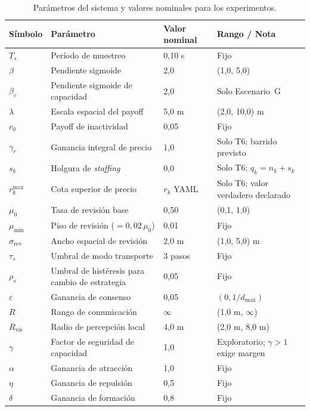 \begin{table}[htbp]
\centering
\scriptsize
\renewcommand{\arraystretch}{1.08}
\caption[Parámetros del sistema]{Parámetros del sistema y valores nominales para los experimentos.}
\label{tab:params}
\begin{tabularx}{\textwidth}{>{\ttfamily}p{}p{}p{}Y}
\toprule
\normalfont Símbolo & Parámetro & Valor nominal & Rango / Nota \\
\midrule
$T_s$ & Período de muestreo & 0{,}10 s & Fijo \\
$\beta$ & Pendiente sigmoide & 2{,}0 & (1{,}0, 5{,}0) \\
$\beta_c$ & Pendiente sigmoide de capacidad & 2{,}0 & Solo Escenario~G \\
$\lambda$ & Escala espacial del payoff & 5{,}0 m & (2{,}0, 10{,}0) m \\
$r_0$ & Payoff de inactividad & 0{,}05 & Fijo \\
$\gamma_r$ & Ganancia integral de precio & 1{,}0 & Solo T6; barrido previsto \\
$s_k$ & Holgura de \emph{staffing} & 0{,}0 & Solo T6; $q_k=n_k+s_k$ \\
$r_k^{\max}$ & Cota superior de precio & $r_k$ YAML & Solo T6; valor verdadero declarado \\
$\mu_0$ & Tasa de revisión base & 0{,}50 & (0{,}1, 1{,}0) \\
$\mu_{\min}$ & Piso de revisión ($= 0{,}02\,\mu_0$) & 0{,}01 & Fijo \\
$\sigma_{\text{rev}}$ & Ancho espacial de revisión & 2{,}0 m & (1{,}0, 5{,}0) m \\
$\tau_s$ & Umbral de modo transporte & 3 pasos & Fijo \\
$\rho_s$ & Umbral de histéresis para cambio de estrategia & 0{,}05 & Fijo \\
$\varepsilon$ & Ganancia de consenso & 0{,}05 & $(0, 1/d_{\max})$ \\
$R$ & Rango de comunicación & $\infty$ & (1{,}0 m, $\infty$) \\
$R_{\mathrm{vis}}$ & Radio de percepción local & 4{,}0 m & (2{,}0 m, 8{,}0 m) \\
$\gamma$ & Factor de seguridad de capacidad & 1{,}0 & Exploratorio; $\gamma>1$ exige margen \\
$\alpha$ & Ganancia de atracción & 1{,}0 & Fijo \\
$\eta$ & Ganancia de repulsión & 0{,}5 & Fijo \\
$\delta$ & Ganancia de formación & 0{,}8 & Fijo \\

\end{tabularx}
\end{table}

